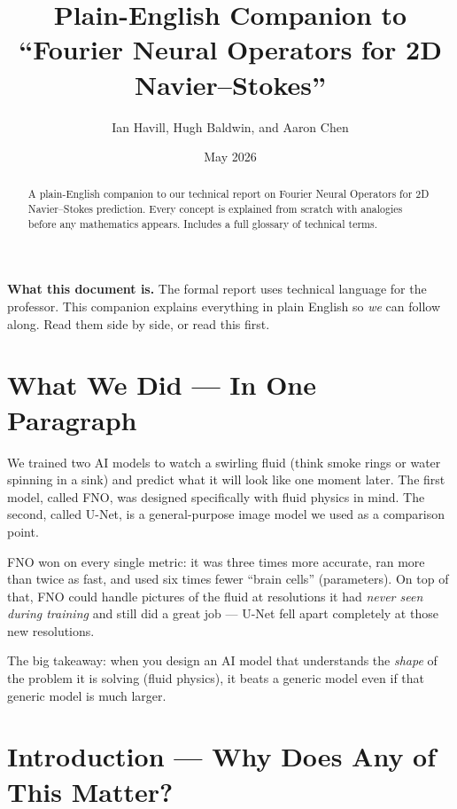 \documentclass[acmsmall,nonacm]{acmart}
\title{Plain-English Companion to\\``Fourier Neural Operators for 2D Navier--Stokes''}
\author{Ian Havill, Hugh Baldwin, and Aaron Chen}
\affiliation{\institution{Occidental College}\city{Los Angeles}\state{CA}\country{USA}}
\date{May 2026}
\begin{document}
\begin{abstract}
A plain-English companion to our technical report on Fourier Neural Operators
for 2D Navier--Stokes prediction.
Every concept is explained from scratch with analogies before any mathematics
appears.
Includes a full glossary of technical terms.
\end{abstract}

\maketitle

\begin{infobox}
\textbf{What this document is.}
The formal report uses technical language for the professor.
This companion explains everything in plain English so \emph{we}
can follow along.
Read them side by side, or read this first.
\end{infobox}

\section*{What We Did --- In One Paragraph}

We trained two AI models to watch a swirling fluid (think smoke rings or water
spinning in a sink) and predict what it will look like one moment later.
The first model, called FNO, was designed specifically with fluid physics in mind.
The second, called U-Net, is a general-purpose image model we used as a
comparison point.

FNO won on every single metric: it was three times more accurate, ran more than
twice as fast, and used six times fewer ``brain cells'' (parameters).
On top of that, FNO could handle pictures of the fluid at resolutions it had
\emph{never seen during training} and still did a great job --- U-Net fell apart
completely at those new resolutions.

The big takeaway: when you design an AI model that understands the \emph{shape}
of the problem it is solving (fluid physics), it beats a generic model even if
that generic model is much larger.

\section{Introduction --- Why Does Any of This Matter?}
\end{document}
